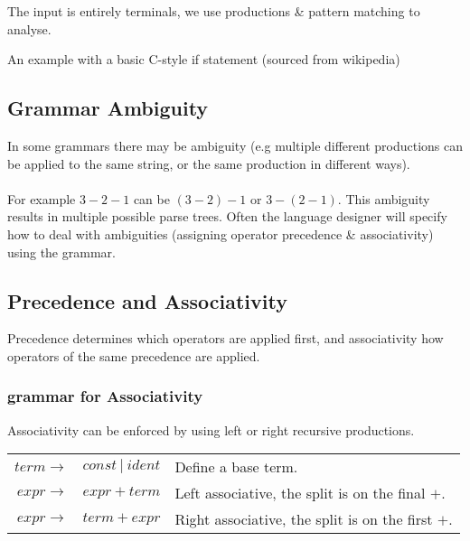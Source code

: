 \documentclass{report}
\begin{document}
            The input is entirely terminals, we use productions \& pattern matching to analyse.
            \centerline{An example with a basic C-style if statement (sourced from wikipedia)}


        \subsection*{Grammar Ambiguity}
            In some grammars there may be ambiguity (e.g multiple different productions can be applied to the same string, or the same production in different ways).
            \\
            \\ For example $3 - 2 - 1$ can be $(3 - 2) - 1$ or $3  - (2 - 1)$. This ambiguity results in multiple possible parse trees.
            Often the language designer will specify how to deal with ambiguities (assigning operator precedence \& associativity) using the grammar.

        \subsection*{Precedence and Associativity}
            Precedence determines which operators are applied first, and associativity how operators of the same precedence are applied.
            
            \subsubsection*{grammar for Associativity}
                Associativity can be enforced by using left or right recursive productions.
                \begin{center}
                    \begin{tabular}{r l l}
                        $term \to$ & $const \ | \ ident$ & Define a base term. \\
                        $expr \to$ & $expr + term$ & Left associative, the split is on the final $+$. \\
                        $expr \to$ & $term + expr$ & Right associative, the split is on the first $+$. \\
                    \end{tabular}
                \end{center}
\end{document}
